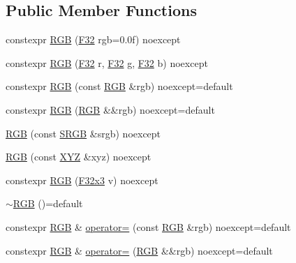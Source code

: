 \subsection*{Public Member Functions}
\begin{DoxyCompactItemize}
\item 
constexpr \mbox{\hyperlink{structmage_1_1_r_g_b_a166d2c13b46f9518c132c68f1117e5c6}{R\+GB}} (\mbox{\hyperlink{namespacemage_aa97e833b45f06d60a0a9c4fc22ae02c0}{F32}} rgb=0.\+0f) noexcept
\item 
constexpr \mbox{\hyperlink{structmage_1_1_r_g_b_af4304d8dc009f1b551442d6ebd15c0fa}{R\+GB}} (\mbox{\hyperlink{namespacemage_aa97e833b45f06d60a0a9c4fc22ae02c0}{F32}} r, \mbox{\hyperlink{namespacemage_aa97e833b45f06d60a0a9c4fc22ae02c0}{F32}} g, \mbox{\hyperlink{namespacemage_aa97e833b45f06d60a0a9c4fc22ae02c0}{F32}} b) noexcept
\item 
constexpr \mbox{\hyperlink{structmage_1_1_r_g_b_a1423c7c8dd83399b16cd33e367a5497c}{R\+GB}} (const \mbox{\hyperlink{structmage_1_1_r_g_b}{R\+GB}} \&rgb) noexcept=default
\item 
constexpr \mbox{\hyperlink{structmage_1_1_r_g_b_a852c4ed04bb38c7913d12fc491185bfb}{R\+GB}} (\mbox{\hyperlink{structmage_1_1_r_g_b}{R\+GB}} \&\&rgb) noexcept=default
\item 
\mbox{\hyperlink{structmage_1_1_r_g_b_a2f2c4eea3b0c44e0f31cfe20c6371d64}{R\+GB}} (const \mbox{\hyperlink{structmage_1_1_s_r_g_b}{S\+R\+GB}} \&srgb) noexcept
\item 
\mbox{\hyperlink{structmage_1_1_r_g_b_a62a2200960f84f1b6bd4b743510201a4}{R\+GB}} (const \mbox{\hyperlink{structmage_1_1_x_y_z}{X\+YZ}} \&xyz) noexcept
\item 
constexpr \mbox{\hyperlink{structmage_1_1_r_g_b_ab80d8120aabe4f52e8de6e99d1af7c8b}{R\+GB}} (\mbox{\hyperlink{namespacemage_a0fef5ab4e073c2d9ea876fefa3da4233}{F32x3}} v) noexcept
\item 
\mbox{\hyperlink{structmage_1_1_r_g_b_a2c01428e1da4ec354b85320a905beab3}{$\sim$\+R\+GB}} ()=default
\item 
constexpr \mbox{\hyperlink{structmage_1_1_r_g_b}{R\+GB}} \& \mbox{\hyperlink{structmage_1_1_r_g_b_ad78ad1a23b801b19a0e8f747dec8637d}{operator=}} (const \mbox{\hyperlink{structmage_1_1_r_g_b}{R\+GB}} \&rgb) noexcept=default
\item 
constexpr \mbox{\hyperlink{structmage_1_1_r_g_b}{R\+GB}} \& \mbox{\hyperlink{structmage_1_1_r_g_b_a87257a9536e7b2eabd49553df67e8945}{operator=}} (\mbox{\hyperlink{structmage_1_1_r_g_b}{R\+GB}} \&\&rgb) noexcept=default

\end{DoxyCompactItemize}
